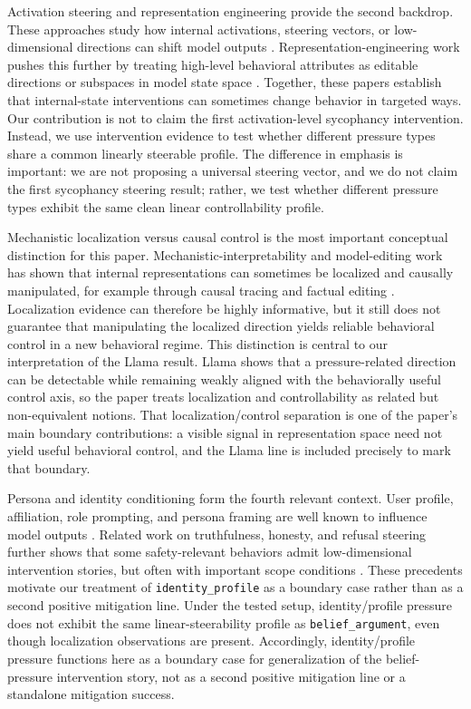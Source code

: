 \documentclass[11pt]{article}
\begin{document}
Activation steering and representation engineering provide the second backdrop.
These approaches study how internal activations, steering vectors, or low-dimensional directions can shift model outputs \cite{stoehr2024activationscaling,scalena2024multiproperty,turner2023activationaddition}.
Representation-engineering work pushes this further by treating high-level behavioral attributes as editable directions or subspaces in model state space \cite{zou2023representationengineering}.
Together, these papers establish that internal-state interventions can sometimes change behavior in targeted ways.
Our contribution is not to claim the first activation-level sycophancy intervention.
Instead, we use intervention evidence to test whether different pressure types share a common linearly steerable profile.
The difference in emphasis is important: we are not proposing a universal steering vector, and we do not claim the first sycophancy steering result; rather, we test whether different pressure types exhibit the same clean linear controllability profile.

Mechanistic localization versus causal control is the most important conceptual distinction for this paper.
Mechanistic-interpretability and model-editing work has shown that internal representations can sometimes be localized and causally manipulated, for example through causal tracing and factual editing \cite{meng2022rome,elhage2022toy,arditi2024refusal}.
Localization evidence can therefore be highly informative, but it still does not guarantee that manipulating the localized direction yields reliable behavioral control in a new behavioral regime.
This distinction is central to our interpretation of the Llama result.
Llama shows that a pressure-related direction can be detectable while remaining weakly aligned with the behaviorally useful control axis, so the paper treats localization and controllability as related but non-equivalent notions.
That localization/control separation is one of the paper's main boundary contributions: a visible signal in representation space need not yield useful behavioral control, and the Llama line is included precisely to mark that boundary.

Persona and identity conditioning form the fourth relevant context.
User profile, affiliation, role prompting, and persona framing are well known to influence model outputs \cite{wang2024rolellm}.
Related work on truthfulness, honesty, and refusal steering further shows that some safety-relevant behaviors admit low-dimensional intervention stories, but often with important scope conditions \cite{lin2022truthfulqa,burns2023latentknowledge,arditi2024refusal}.
These precedents motivate our treatment of \texttt{identity\_profile} as a boundary case rather than as a second positive mitigation line.
Under the tested setup, identity/profile pressure does not exhibit the same linear-steerability profile as \texttt{belief\_argument}, even though localization observations are present.
Accordingly, identity/profile pressure functions here as a boundary case for generalization of the belief-pressure intervention story, not as a second positive mitigation line or a standalone mitigation success.
\end{document}
